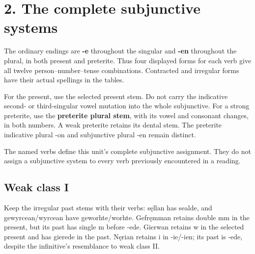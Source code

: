 \section*{2. The complete subjunctive systems}

The ordinary endings are \textbf{-e} throughout the singular and \textbf{-en} throughout the plural, in both present and preterite. Thus four displayed forms for each verb give all twelve person–number–tense combinations. Contracted and irregular forms have their actual spellings in the tables.

For the present, use the selected present stem. Do not carry the indicative second- or third-singular vowel mutation into the whole subjunctive. For a strong preterite, use the \textbf{preterite plural stem}, with its vowel and consonant changes, in both numbers. A weak preterite retains its dental stem. The preterite indicative plural -on and subjunctive plural -en remain distinct.

The named verbs define this unit’s complete subjunctive assignment. They do not assign a subjunctive system to every verb previously encountered in a reading.

\subsection*{Weak class I}

Keep the irregular past stems with their verbs: sęllan has sealde, and gewyrcean/\allowbreak{}wyrcean have geworhte/\allowbreak{}worhte. Gefręmman retains double mm in the present, but its past has single m before -ede. Gierwan retains w in the selected present and has gierede in the past. Nęrian retains i in -ie/\allowbreak{}-ien; its past is -ede, despite the infinitive’s resemblance to weak class II.

